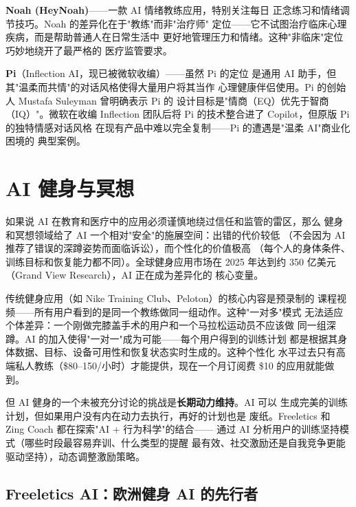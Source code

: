 \textbf{Noah (HeyNoah)}——一款 AI 情绪教练应用，特别关注每日
正念练习和情绪调节技巧。Noah 的差异化在于"教练"而非"治疗师"
定位——它不试图治疗临床心理疾病，而是帮助普通人在日常生活中
更好地管理压力和情绪。这种"非临床"定位巧妙地绕开了最严格的
医疗监管要求。

\textbf{Pi}（Inflection AI，现已被微软收编）——虽然 Pi 的定位
是通用 AI 助手，但其"温柔而共情"的对话风格使得大量用户将其当作
心理健康伴侣使用。Pi 的创始人 Mustafa Suleyman 曾明确表示 Pi 的
设计目标是"情商（EQ）优先于智商（IQ）"。微软在收编 Inflection
团队后将 Pi 的技术整合进了 Copilot，但原版 Pi 的独特情感对话风格
在现有产品中难以完全复制——Pi 的遭遇是"温柔 AI"商业化困境的
典型案例。



\section{AI 健身与冥想}
\label{sec:life-fitness}

如果说 AI 在教育和医疗中的应用必须谨慎地绕过信任和监管的雷区，那么
健身和冥想领域给了 AI 一个相对"安全"的施展空间：出错的代价较低
（不会因为 AI 推荐了错误的深蹲姿势而面临诉讼），而个性化的价值极高
（每个人的身体条件、训练目标和恢复能力都不同）。全球健身应用市场在
2025 年达到约 350 亿美元（Grand View Research），AI 正在成为差异化的
核心变量。

传统健身应用（如 Nike Training Club、Peloton）的核心内容是预录制的
课程视频——所有用户看到的是同一个教练做同一组动作。这种"一对多"模式
无法适应个体差异：一个刚做完膝盖手术的用户和一个马拉松运动员不应该做
同一组深蹲。AI 的加入使得"一对一"成为可能——每个用户得到的训练计划
都是根据其身体数据、目标、设备可用性和恢复状态实时生成的。这种个性化
水平过去只有高端私人教练（\$80--150/小时）才能提供，现在一个月订阅费
\$10 的应用就能做到。

但 AI 健身的一个未被充分讨论的挑战是\textbf{长期动力维持}。AI 可以
生成完美的训练计划，但如果用户没有内在动力去执行，再好的计划也是
废纸。Freeletics 和 Zing Coach 都在探索"AI + 行为科学"的结合——
通过 AI 分析用户的训练坚持模式（哪些时段最容易弃训、什么类型的提醒
最有效、社交激励还是自我竞争更能驱动坚持），动态调整激励策略。

\subsection{Freeletics AI：欧洲健身 AI 的先行者}
\label{subsec:freeletics}

